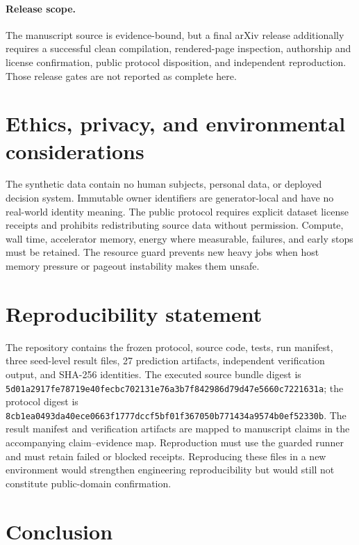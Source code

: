 \documentclass[11pt]{article}
\begin{document}
\paragraph{Release scope.}
The manuscript source is evidence-bound, but a final arXiv release additionally
requires a successful clean compilation, rendered-page inspection, authorship
and license confirmation, public protocol disposition, and independent
reproduction. Those release gates are not reported as complete here.

\section{Ethics, privacy, and environmental considerations}

The synthetic data contain no human subjects, personal data, or deployed
decision system. Immutable owner identifiers are generator-local and have no
real-world identity meaning. The public protocol requires explicit dataset
license receipts and prohibits redistributing source data without permission.
Compute, wall time, accelerator memory, energy where measurable, failures, and
early stops must be retained. The resource guard prevents new heavy jobs when
host memory pressure or pageout instability makes them unsafe.

\section{Reproducibility statement}

The repository contains the frozen protocol, source code, tests, run manifest,
three seed-level result files, 27 prediction artifacts, independent verification
output, and SHA-256 identities. The executed source bundle digest is
\texttt{5d01a2917fe78719e40fecbc702131e76a3b7f842986d79d47e5660c7221631a};
the protocol digest is
\texttt{8cb1ea0493da40ece0663f1777dccf5bf01f367050b771434a9574b0ef52330b}.
The result manifest and verification artifacts are mapped to manuscript claims
in the accompanying claim--evidence map. Reproduction must use the guarded
runner and must retain failed or blocked receipts. Reproducing these files in a
new environment would strengthen engineering reproducibility but would still
not constitute public-domain confirmation.

\section{Conclusion}
\end{document}
